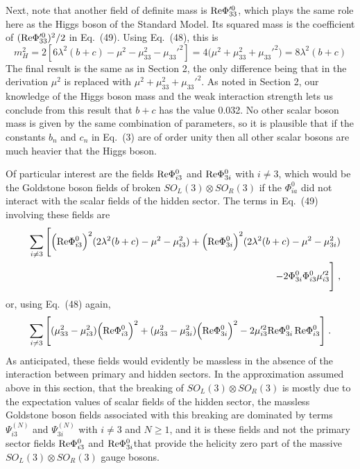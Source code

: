 \documentclass[12pt]{article}
\begin{document}
Next, note that another  field of definite mass is ${\rm Re}\Phi_{33}'^0$, which plays the same role here as the Higgs boson of the Standard Model.
Its squared mass is the coefficient of $({\rm Re}\Phi_{33}'^0)^2/2$  in Eq.~(49).  Using Eq.~(48), this is
\begin{equation}
m_H^2=2[6\lambda^2(b+c)-\mu^2-\mu_{33}^2-\mu_{33}'^2]=4\Big(\mu^2+\mu_{33}^2+\mu_{33}'^2\Big)=8\lambda^2(b+c)
\end{equation}
The final result is the same as in Section 2, the only difference being that in the derivation $\mu^2$ is replaced with 
$\mu^2+\mu_{33}^2+\mu_{33}'^2$.  As noted in Section 2, our knowledge of the Higgs boson mass and the weak interaction strength lets us conclude from this result that $b+c$ has the value 0.032.  No other scalar boson mass is given by the same combination of parameters, so it is plausible that if the constants $b_n$ and $c_n$ in Eq.~(3) are of order unity then  all other scalar bosons are much heavier that the Higgs boson.

Of particular interest are the fields ${\rm Re}\Phi_{i3}^0$ and ${\rm Re}\Phi_{3i}^0$ with $i\neq 3$, which would be the Goldstone boson fields of broken 
$SO_L(3)\otimes SO_R(3)$ if the $\Phi^0_{ia}$ did not interact with the scalar fields of the hidden sector.  The terms in Eq.~(49) involving these fields are
\begin{eqnarray*}
&&\sum_{i\neq 3}\Bigg[\Big({\rm Re}\Phi^0_{i3}\Big)^2(2\lambda^2(b+c)-\mu^2-\mu_{i3}^2)
+\Big({\rm Re}\Phi^0_{3i}\Big)^2(2\lambda^2(b+c)-\mu^2-\mu_{3i}^2)\\&&
-2\Phi^0_{3i}\Phi^0_{i3}\mu'^2_{i3}\Bigg]\;,
\end{eqnarray*}
or, using Eq.~(48) again,
\begin{equation}
\sum_{i\neq 3}\Bigg[(\mu^2_{33}-\mu_{i3}^2)\Big({\rm Re}\Phi^0_{i3}\Big)^2
+(\mu^2_{33}-\mu_{3i}^2)\Big({\rm Re}\Phi^0_{3i}\Big)^2
-2\mu'^2_{i3}{\rm Re}\Phi^0_{3i}\,{\rm Re}\Phi^0_{i3}\Bigg]\;.
\end{equation}
As anticipated, these fields would evidently be massless  in the absence of the interaction between primary and hidden sectors.  
In the approximation assumed above in this section, that the breaking of $SO_L(3)\otimes SO_R(3)$ is mostly due to the expectation values of scalar fields of the hidden sector, the massless Goldstone boson fields associated with this breaking are dominated by terms $\Psi^{(N)}_{i3}$ and 
$\Psi^{(N)}_{3i}$ with $i\neq 3$ and $N\geq 1$, and it is these fields and not the primary sector fields ${\rm Re}\Phi^0_{i3}$ and ${\rm Re}\Phi^0_{3i}$that provide the helicity zero part of the massive  
$SO_L(3)\otimes SO_R(3)$ gauge bosons.
\end{document}
